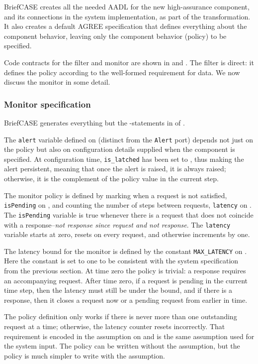 BriefCASE creates all the needed AADL for the new high-assurance
component, and its connections in the system implementation, as part
of the transformation.  It also creates a default AGREE specification
that defines everything about the component behavior, leaving only the
component behavior (policy) to be specified.

Code contracts for the filter and monitor are shown in
 and .
The filter is direct: it defines the policy according to the
well-formed requirement for data.  We now discuss the monitor in some
detail.

\subsubsection{Monitor specification}
BriefCASE generates everything but the
-statements in  of
.

The \texttt{alert} variable defined on 
(distinct from the \texttt{Alert} port) depends not just on the policy
but also on configuration details supplied when the component is
specified.  At configuration time, \texttt{is\_latched} has been set
to , thus making the alert persistent, meaning that once
the alert is raised, it is always raised; otherwise, it is the
complement of the policy value in the current step.

The monitor policy is defined by marking when a request is not
satisfied, \texttt{isPending} on , and
counting the number of steps between requests, \texttt{latency} on
.  The \texttt{isPending} variable is true
whenever there is a request that does not coincide with a
response--\emph{not response since request and not response}.  The
\texttt{latency} variable starts at zero, resets on every request, and
otherwise increments by one.

The latency bound for the monitor is defined by the constant
\texttt{MAX\_LATENCY} on .  Here the constant
is set to one to be consistent with the system specification from the
previous section.  At time zero the policy is trivial: a response
requires an accompanying request.  After time zero, if a request is
pending in the current time step, then the latency must still be under
the bound, and if there is a response, then it closes a request now or
a pending request from earlier in time.

The policy definition only works if there is never more than one
outstanding request at a time; otherwise, the latency counter resets
incorrectly.  That requirement is encoded in the assumption on
 and is the same assumption used for the
system input.  The policy can be written without the assumption,
but the policy is much simpler to write with the assumption.

